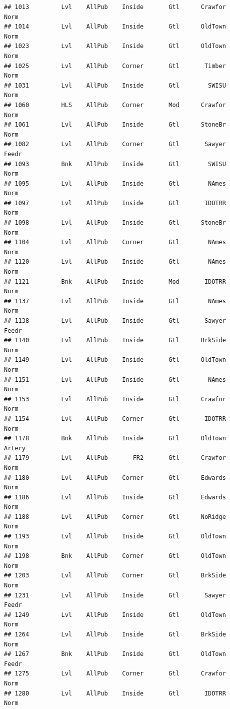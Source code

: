 \documentclass[]{article}
\begin{document}
\begin{verbatim}
## 1013         Lvl    AllPub    Inside       Gtl      Crawfor       Norm
## 1014         Lvl    AllPub    Inside       Gtl      OldTown       Norm
## 1023         Lvl    AllPub    Inside       Gtl      OldTown       Norm
## 1025         Lvl    AllPub    Corner       Gtl       Timber       Norm
## 1031         Lvl    AllPub    Inside       Gtl        SWISU       Norm
## 1060         HLS    AllPub    Corner       Mod      Crawfor       Norm
## 1061         Lvl    AllPub    Inside       Gtl      StoneBr       Norm
## 1082         Lvl    AllPub    Corner       Gtl       Sawyer      Feedr
## 1093         Bnk    AllPub    Inside       Gtl        SWISU       Norm
## 1095         Lvl    AllPub    Inside       Gtl        NAmes       Norm
## 1097         Lvl    AllPub    Inside       Gtl       IDOTRR       Norm
## 1098         Lvl    AllPub    Inside       Gtl      StoneBr       Norm
## 1104         Lvl    AllPub    Corner       Gtl        NAmes       Norm
## 1120         Lvl    AllPub    Inside       Gtl        NAmes       Norm
## 1121         Bnk    AllPub    Inside       Mod       IDOTRR       Norm
## 1137         Lvl    AllPub    Inside       Gtl        NAmes       Norm
## 1138         Lvl    AllPub    Inside       Gtl       Sawyer      Feedr
## 1140         Lvl    AllPub    Inside       Gtl      BrkSide       Norm
## 1149         Lvl    AllPub    Inside       Gtl      OldTown       Norm
## 1151         Lvl    AllPub    Inside       Gtl        NAmes       Norm
## 1153         Lvl    AllPub    Inside       Gtl      Crawfor       Norm
## 1154         Lvl    AllPub    Corner       Gtl       IDOTRR       Norm
## 1178         Bnk    AllPub    Inside       Gtl      OldTown     Artery
## 1179         Lvl    AllPub       FR2       Gtl      Crawfor       Norm
## 1180         Lvl    AllPub    Corner       Gtl      Edwards       Norm
## 1186         Lvl    AllPub    Inside       Gtl      Edwards       Norm
## 1188         Lvl    AllPub    Corner       Gtl      NoRidge       Norm
## 1193         Lvl    AllPub    Inside       Gtl      OldTown       Norm
## 1198         Bnk    AllPub    Corner       Gtl      OldTown       Norm
## 1203         Lvl    AllPub    Corner       Gtl      BrkSide       Norm
## 1231         Lvl    AllPub    Inside       Gtl       Sawyer      Feedr
## 1249         Lvl    AllPub    Inside       Gtl      OldTown       Norm
## 1264         Lvl    AllPub    Inside       Gtl      BrkSide       Norm
## 1267         Bnk    AllPub    Inside       Gtl      OldTown      Feedr
## 1275         Lvl    AllPub    Corner       Gtl      Crawfor       Norm
## 1280         Lvl    AllPub    Inside       Gtl       IDOTRR       Norm

\end{verbatim}
\end{document}
